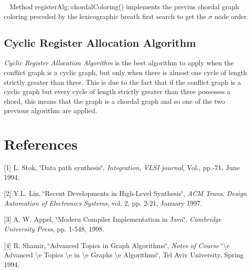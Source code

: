 ~\newline
 Method register\+Alg\+::chordal\+Coloring() implements the previus chordal graph coloring preceded by the lexicographic breath first search to get the $\sigma$ node order.\hypertarget{src_HLS_registerAllocation_page_craa}{}\subsection{Cyclic Register Allocation Algorithm}\label{src_HLS_registerAllocation_page_craa}
{\itshape Cyclic Register Allocation Algorithm} is the best algorithm to apply when the conflict graph is a cyclic graph, but only when there is almost one cycle of length strictly greater than three. This is due to the fact that if the conflict graph is a cyclic graph but every cycle of length strictly greater than three possesses a chord, this means that the graph is a chordal graph and so one of the two previous algorithm are applied.\hypertarget{src_HLS_registerAllocation_page_references}{}\section{References}\label{src_HLS_registerAllocation_page_references}
\mbox{[}1\mbox{]} L. Stok, \char`\"{}\+Data path synthesis\char`\"{}, {\itshape Integration}, {\itshape V\+L\+SI} {\itshape journal}, Vol., pp.-\/71, June 1994.

\mbox{[}2\mbox{]} Y.\+L. Lin, \char`\"{}\+Recent Developments in High-\/\+Level Synthesis\char`\"{}, {\itshape A\+CM} {\itshape Trans}. {\itshape Design} {\itshape Automation} {\itshape of} {\itshape Electronics} {\itshape Systems}, vol. 2, pp. 2-\/21, January 1997.

\mbox{[}3\mbox{]} A. W. Appel, \char`\"{}\+Modern Compiler Implementation in Java\char`\"{}, {\itshape Cambridge} {\itshape University} {\itshape Press}, pp. 1-\/548, 1998.

\mbox{[}4\mbox{]} R. Shamir, \char`\"{}\+Advanced Topics in Graph Algorithms\char`\"{}, {\itshape Notes} {\itshape of} {\itshape Course} \char`\"{}\textbackslash{}e Advanced \textbackslash{}e Topics \textbackslash{}e in \textbackslash{}e Graphs \textbackslash{}e Algorithms\char`\"{}, Tel Aviv University, Spring 1994. 